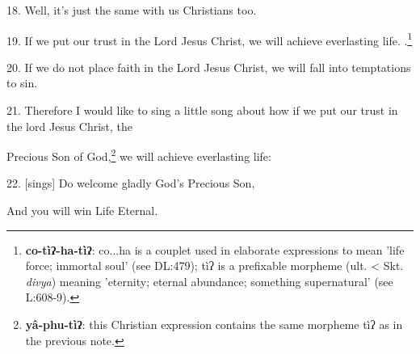 18. Well, it's just the same with us Christians too.

19. If we put our trust in the Lord Jesus Christ, we will achieve everlasting life.
.\footnote{\textbf{co-tìʔ-ha-tìʔ}: co...ha is a couplet used in elaborate expressions to mean 'life force; immortal soul' (see DL:479); tìʔ is a prefixable morpheme (ult. < Skt. \textit{divya}) meaning 'eternity; eternal abundance; something supernatural' (see L:608-9).}

20. If we do not place faith in the Lord Jesus Christ, we will fall into temptations
to sin.

21. Therefore I would like to sing a little song about how if we put our trust
in the lord Jesus Christ, the

Precious Son of God,\footnote{\textbf{yâ-phu-tìʔ}: this Christian expression contains the same morpheme tìʔ as in the previous note.} we will achieve everlasting life:

22. [sings] Do welcome gladly God's Precious Son,

And you will win Life Eternal.

